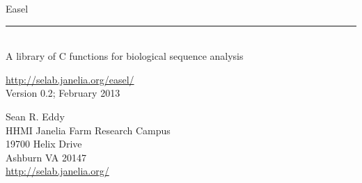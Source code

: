 \begin{titlepage}
{\Large

\vspace*{\fill}

\noindent
{\Huge{Easel}} \\ 
\rule[2pt]{\textwidth}{1pt} \\
\hspace*{\fill} {\large {A library of C functions for
    biological sequence analysis} \\ }

\vspace*{\fill}

\begin{center}
\url{http://selab.janelia.org/easel/}\\
Version 0.2; February 2013 \\ 

\vspace*{\fill}

Sean R. Eddy\\
HHMI Janelia Farm Research Campus\\
19700 Helix Drive\\
Ashburn VA 20147\\
\url{http://selab.janelia.org/}\\
\end{center}

\vspace*{\fill}
}
\end{titlepage}
